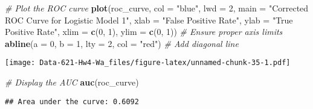 \documentclass[
]{article}
\newenvironment{Shaded}{\begin{snugshade}}{\end{snugshade}}
\newcommand{\AttributeTok}[1]{\textcolor[rgb]{0.13,0.29,0.53}{#1}}
\newcommand{\CommentTok}[1]{\textcolor[rgb]{0.56,0.35,0.01}{\textit{#1}}}
\newcommand{\DecValTok}[1]{\textcolor[rgb]{0.00,0.00,0.81}{#1}}
\newcommand{\FloatTok}[1]{\textcolor[rgb]{0.00,0.00,0.81}{#1}}
\newcommand{\FunctionTok}[1]{\textcolor[rgb]{0.13,0.29,0.53}{\textbf{#1}}}
\newcommand{\NormalTok}[1]{#1}
\newcommand{\OtherTok}[1]{\textcolor[rgb]{0.56,0.35,0.01}{#1}}
\newcommand{\SpecialCharTok}[1]{\textcolor[rgb]{0.81,0.36,0.00}{\textbf{#1}}}
\newcommand{\StringTok}[1]{\textcolor[rgb]{0.31,0.60,0.02}{#1}}
\begin{document}
\begin{Shaded}
\begin{Highlighting}[]
\CommentTok{\# Plot the ROC curve}
\FunctionTok{plot}\NormalTok{(roc\_curve, }\AttributeTok{col =} \StringTok{"blue"}\NormalTok{, }\AttributeTok{lwd =} \DecValTok{2}\NormalTok{, }
     \AttributeTok{main =} \StringTok{"Corrected ROC Curve for Logistic Model 1"}\NormalTok{,}
     \AttributeTok{xlab =} \StringTok{"False Positive Rate"}\NormalTok{, }\AttributeTok{ylab =} \StringTok{"True Positive Rate"}\NormalTok{, }
     \AttributeTok{xlim =} \FunctionTok{c}\NormalTok{(}\DecValTok{0}\NormalTok{, }\DecValTok{1}\NormalTok{), }\AttributeTok{ylim =} \FunctionTok{c}\NormalTok{(}\DecValTok{0}\NormalTok{, }\DecValTok{1}\NormalTok{))  }\CommentTok{\# Ensure proper axis limits}
\FunctionTok{abline}\NormalTok{(}\AttributeTok{a =} \DecValTok{0}\NormalTok{, }\AttributeTok{b =} \DecValTok{1}\NormalTok{, }\AttributeTok{lty =} \DecValTok{2}\NormalTok{, }\AttributeTok{col =} \StringTok{"red"}\NormalTok{)  }\CommentTok{\# Add diagonal line}
\end{Highlighting}
\end{Shaded}

\texttt{[image: Data-621-Hw4-Wa\_files/figure-latex/unnamed-chunk-35-1.pdf]}

\begin{Shaded}
\begin{Highlighting}[]
\CommentTok{\# Display the AUC}
\FunctionTok{auc}\NormalTok{(roc\_curve)}
\end{Highlighting}
\end{Shaded}

\begin{verbatim}
## Area under the curve: 0.6092
\end{verbatim}

\begin{Shaded}
\end{Shaded}
\end{document}
